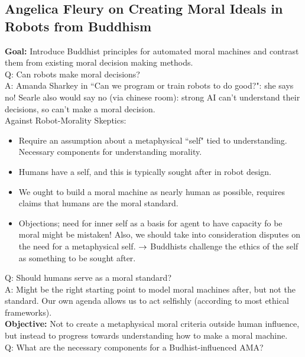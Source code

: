 \spacerule
\subsection{Angelica Fleury on Creating Moral Ideals in Robots from Buddhism}


{\bf Goal:} Introduce Buddhist principles for automated moral machines and contrast them from existing moral decision making methods. \\

Q: Can robots make moral decisions? \\

A: Amanda Sharkey in ``Can we program or train robots to do good?": she says no! Searle also would say no (via chinese room): strong AI can't understand their decisions, so can't make a moral decision. \\

Against Robot-Morality Skeptics:
\begin{itemize}
\item Require an assumption about a metaphysical ``self" tied to understanding. Necessary components for understanding morality.
\item Humans have a self, and this is typically sought after in robot design.
\item We ought to build a moral machine as nearly human as possible, requires claims that humans are the moral standard.
\item Objections; need for inner self as a basis for agent to have capacity fo be moral might be mistaken! Also, we should take into consideration disputes on the need for a metaphysical self.
$\rightarrow$ Buddhists challenge the ethics of the self as something to be sought after.
\end{itemize}


Q: Should humans serve as a moral standard? \\

A: Might be the right starting point to model moral machines after, but not the standard. Our own agenda allows us to act selfishly (according to most ethical frameworks). \\

{\bf Objective:} Not to create a metaphysical moral criteria outside human influence, but instead to progress towards understanding how to make a moral machine. \\

Q: What are the necessary components for a Budhist-influenced AMA?

